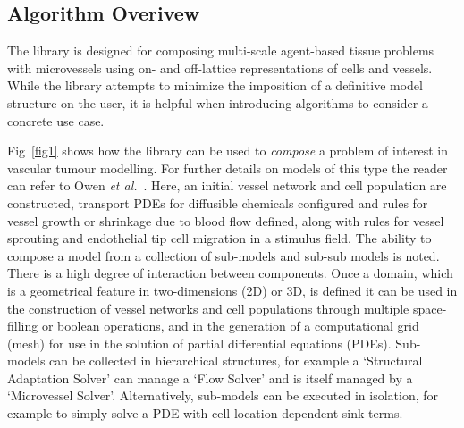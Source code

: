 \documentclass[10pt,letterpaper]{article}
\begin{document}
\subsection*{Algorithm Overivew}

The library is designed for composing multi-scale agent-based tissue problems with microvessels using on- and off-lattice representations of cells and vessels. While the library attempts to minimize the imposition of a definitive model structure on the user, it is helpful when introducing algorithms to consider a concrete use case. 

Fig~\ref{fig1} shows how the library can be used to \emph{compose} a problem of interest in vascular tumour modelling. For further details on models of this type the reader can refer to Owen \emph{et al.}~\cite{Owen2011}. Here, an initial vessel network and cell population are constructed, transport PDEs for diffusible chemicals configured and rules for vessel growth or shrinkage due to blood flow defined, along with rules for vessel sprouting and endothelial tip cell migration in a stimulus field. The ability to compose a model from a collection of sub-models and sub-sub models is noted. There is a high degree of interaction between components. Once a domain, which is a geometrical feature in two-dimensions (2D) or 3D, is defined it can be used in the construction of vessel networks and cell populations through multiple space-filling or boolean operations, and in the generation of a computational grid (mesh) for use in the solution of partial differential equations (PDEs). Sub-models can be collected in hierarchical structures, for example a `Structural Adaptation Solver' can manage a `Flow Solver' and is itself managed by a `Microvessel Solver'. Alternatively, sub-models can be executed in isolation, for example to simply solve a PDE with cell location dependent sink terms.
\end{document}
